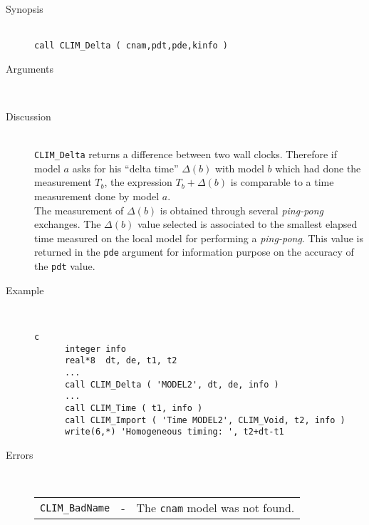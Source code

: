 \begin{description}
  \item[Synopsis]~ \\[10pt]
    {\tt call CLIM\_Delta ( cnam,pdt,pde,kinfo )}
  \item[Arguments]~
  \item[Discussion]~\\[10pt]
    {\tt CLIM\_Delta} returns a difference between two wall clocks.
    Therefore if model $a$ asks for his ``delta time'' $\Delta(b)$
    with model $b$ which had done the measurement $T_b$, the expression
    $T_b + \Delta(b)$ is comparable to a time measurement done by model
    $a$. \\

    The measurement of $\Delta(b)$ is obtained through several
    {\it ping-pong} exchanges. The $\Delta(b)$ value selected is
    associated to the smallest elapsed time measured on the local model
    for performing a {\it ping-pong}. This value is returned in
    the {\tt pde} argument for information purpose on the accuracy of
    the {\tt pdt} value.
  \item[Example]~
    \begin{verbatim}
c
      integer info
      real*8  dt, de, t1, t2
      ...
      call CLIM_Delta ( 'MODEL2', dt, de, info )
      ...
      call CLIM_Time ( t1, info )
      call CLIM_Import ( 'Time MODEL2', CLIM_Void, t2, info )
      write(6,*) 'Homogeneous timing: ', t2+dt-t1
    \end{verbatim}
  \item[Errors]~\\[10pt]
    \begin{tabular}{l l p{10cm} }
      {\tt CLIM\_BadName} & - & The {\tt cnam} model was not found. \\
    \end{tabular}
\end{description}
